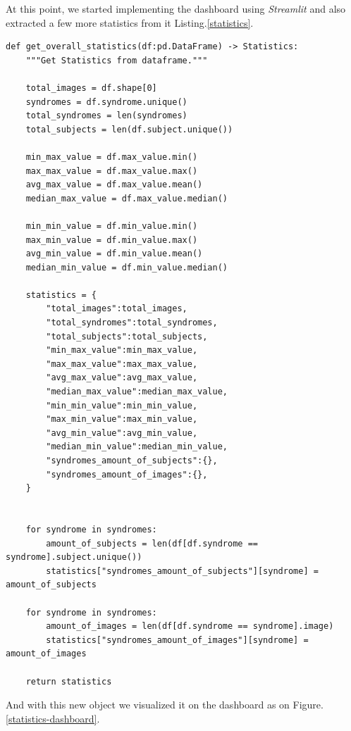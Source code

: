 \documentclass{article}
\begin{document}
At this point, we started implementing the dashboard using \textit{Streamlit} and also extracted a few more statistics from it Listing.\ref{statistics}.

\newpage
\begin{listing}[H]
	\centering
\begin{verbatim} 
def get_overall_statistics(df:pd.DataFrame) -> Statistics:
	"""Get Statistics from dataframe.""" 
	
	total_images = df.shape[0]
	syndromes = df.syndrome.unique()
	total_syndromes = len(syndromes)
	total_subjects = len(df.subject.unique())
	
	min_max_value = df.max_value.min()
	max_max_value = df.max_value.max()
	avg_max_value = df.max_value.mean()
	median_max_value = df.max_value.median()
	
	min_min_value = df.min_value.min()
	max_min_value = df.min_value.max()
	avg_min_value = df.min_value.mean()
	median_min_value = df.min_value.median()
	
	statistics = {
		"total_images":total_images,
		"total_syndromes":total_syndromes,
		"total_subjects":total_subjects,
		"min_max_value":min_max_value,
		"max_max_value":max_max_value,
		"avg_max_value":avg_max_value,
		"median_max_value":median_max_value,
		"min_min_value":min_min_value,
		"max_min_value":max_min_value,
		"avg_min_value":avg_min_value,
		"median_min_value":median_min_value,
		"syndromes_amount_of_subjects":{},
		"syndromes_amount_of_images":{},
	}
	
	
	for syndrome in syndromes:
		amount_of_subjects = len(df[df.syndrome == syndrome].subject.unique())
		statistics["syndromes_amount_of_subjects"][syndrome] = amount_of_subjects
	
	for syndrome in syndromes:
		amount_of_images = len(df[df.syndrome == syndrome].image)
		statistics["syndromes_amount_of_images"][syndrome] = amount_of_images
	
	return statistics
\end{verbatim}

	\caption{\textit{Python} function to get overall statistics from the input DataFrame. Some more characteristics were extracted this time.}
	\label{statistics}
\end{listing}
\newpage

And with this new object we visualized it on the dashboard as on Figure.\ref{statistics-dashboard}.
\end{document}
